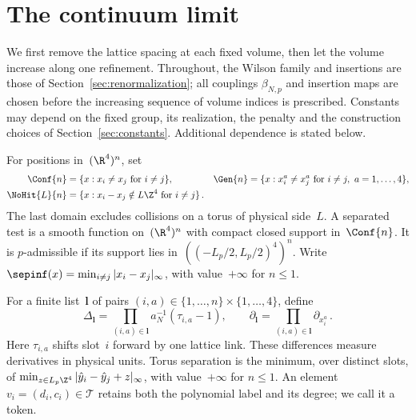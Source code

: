 \section{The continuum limit}\label{sec:continuum}

We first remove the lattice spacing at each fixed volume, then let the volume increase along one refinement. Throughout, the Wilson family and insertions are those of Section~\ref{sec:renormalization}; all couplings $\beta_{N,p}$ and insertion maps are chosen before the increasing sequence of volume indices is prescribed. Constants may depend on the fixed group, its realization, the penalty and the construction choices of Section~\ref{sec:constants}. Additional dependence is stated below.

For positions in~$(\R^4)^n$, set
\begin{align*}
\Conf{n}&=\{x:x_i\ne x_j\text{ for }i\ne j\},&
\Gen{n}&=\{x:x_i^a\ne x_j^a\text{ for }i\ne j,\ a=1,\ldots,4\},\\
\NoHit{L}{n}&=\{x:x_i-x_j\notin L\Z^4\text{ for }i\ne j\}\,.
\end{align*}
The last domain excludes collisions on a torus of physical side~$L$. A separated test is a smooth function on~$(\R^4)^n$ with compact closed support in~$\Conf{n}$. It is $p$-admissible if its support lies in~$((-L_p/2,L_p/2)^4)^n$. Write $\sepinf(x)=\min_{i\ne j}|x_i-x_j|_\infty$, with value~$+\infty$ for $n\le1$.

For a finite list~$\boldsymbol l$ of pairs $(i,a)\in\{1,\ldots,n\}\times\{1,\ldots,4\}$, define
\begin{equation*}
\Delta_{\boldsymbol l}=\prod_{(i,a)\in\boldsymbol l}a_N^{-1}(\tau_{i,a}-1),\qquad
\partial_{\boldsymbol l}=\prod_{(i,a)\in\boldsymbol l}\partial_{x_i^a}\,.
\end{equation*}
Here $\tau_{i,a}$ shifts slot~$i$ forward by one lattice link. These differences measure derivatives in physical units. Torus separation is the minimum, over distinct slots, of $\min_{z\in L_p\Z^4}|\hat y_i-\hat y_j+z|_\infty$, with value~$+\infty$ for $n\le1$. An element $v_i=(d_i,c_i)\in\mathcal T$ retains both the polynomial label and its degree; we call it a token.

